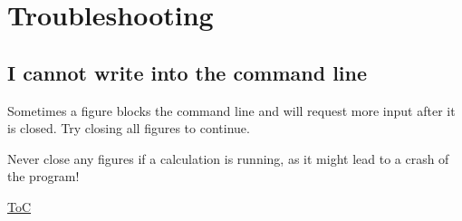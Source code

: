 \section{Troubleshooting}

\subsection{I cannot write into the command line}
Sometimes a figure blocks the command line and will request more input after it is closed.
Try closing all figures to continue.

Never close any figures if a calculation is running, as it might lead to a crash of the program!


\begin{flushright}
    \hyperref[toc]{ToC}
\end{flushright}